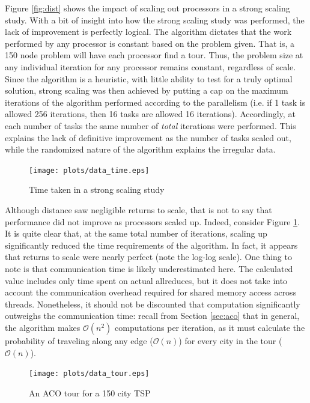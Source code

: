 \documentclass[twocolumn]{article}
\begin{document}
Figure \ref{fig:dist} shows the impact of scaling out processors in a strong
scaling study. With a bit of insight into how the strong scaling study was
performed, the lack of improvement is perfectly logical. The algorithm dictates
that the work performed by any processor is constant based on the problem given.
That is, a 150 node problem will have each processor find a tour. Thus, the problem
size at any individual iteration for any processor remains constant, regardless of
scale. Since the algorithm is a heuristic, with little ability to test for a truly
optimal solution, strong scaling was then achieved by putting a cap on the maximum
iterations of the algorithm performed according to the parallelism (i.e. if 1 task
is allowed 256 iterations, then 16 tasks are allowed 16 iterations). Accordingly,
at each number of tasks the same number of \emph{total} iterations were performed. 
This explains the lack of definitive improvement as the number of tasks scaled out,
while the randomized nature of the algorithm explains the irregular data. 

\begin{figure}
  \centering
  \texttt{[image: plots/data\_time.eps]}
  \caption{Time taken in a strong scaling study} \label{fig:time}
\end{figure}

Although distance saw negligible returns to scale, that is not to say that 
performance did not improve as processors scaled up. Indeed, consider Figure
\ref{fig:time}. It is quite clear that, at the same total number of iterations,
scaling up significantly reduced the time requirements of the algorithm. In fact,
it appears that returns to scale were nearly perfect (note the log-log scale). 
One thing to note is that communication time is likely underestimated here. The
calculated value
includes only time spent on actual allreduces, but it does not take into account
the communication overhead required for shared memory access across threads. 
Nonetheless, it should not be discounted that computation significantly outweighs
the communication time: recall from Section \ref{sec:aco} that in general, the 
algorithm makes $\mathcal{O}(n^2)$ 
computations per iteration, as it must calculate the probability of traveling 
along any edge ($\mathcal{O}(n)$) for every city in the tour ($\mathcal{O}(n)$). 

\begin{figure}[t]
  \centering
  \texttt{[image: plots/data\_tour.eps]}
  \caption{An ACO tour for a 150 city TSP} \label{fig:ourtour}
\end{figure}
\end{document}
